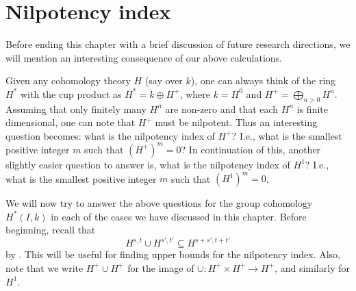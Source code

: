 \section{Nilpotency index}%
\label{sec:nilp-index}

Before ending this chapter with a brief discussion of future research directions, we will mention an interesting consequence of our above calculations.

Given any cohomology theory $H$ (say over $k$), one can always think of the ring $H^{*}$ with the cup product as $H^{*} = k \oplus H^{+}$, where $k = H^{0}$ and $H^{+} = \bigoplus_{n>0} H^{n}$. Assuming that only finitely many $H^{n}$ are non-zero and that each $H^{n}$ is finite dimensional, one can note that $H^{+}$ must be nilpotent. Thus an interesting question becomes: what is the nilpotency index of $H^{+}$? I.e., what is the smallest positive integer $m$ such that $(H^{+})^{m} = 0$? In continuation of this, another slightly easier question to answer is, what is the nilpotency index of $H^{1}$? I.e., what is the smallest positive integer $m$ such that $(H^{1})^{m} = 0$.


We will now try to answer the above questions for the group cohomology $H^{*}(I,k)$ in each of the cases we have discussed in this chapter. Before beginning, recall that
\begin{equation}\label{eq:graded-coh-inc}
  H^{s,t} \cup H^{s',t'} \subseteq H^{s+s',t+t'}
\end{equation}
by \cite[Chap.~1~§3.7]{Fuks}. This will be useful for finding upper bounds for the nilpotency index. Also, note that we write $H^{+} \cup H^{+}$ for the image of $\cup \colon H^{+} \times H^{+} \to H^{+}$, and similarly for $H^{1}$.

